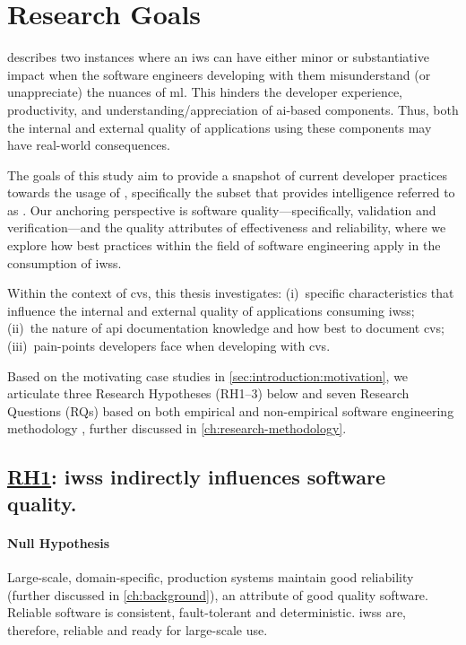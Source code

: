 \section{Research Goals}
\label{sec:introduction:hypohtesis}

 describes two instances where an \gls{iws} can have either minor or substantiative impact when the software engineers developing with them misunderstand (or unappreciate) the nuances of \gls{ml}. This hinders the developer experience, productivity, and understanding/appreciation of \gls{ai}-based components. Thus, both the internal and external quality of applications using these components may have real-world consequences.

The goals of this study aim to provide a snapshot of current developer practices towards the usage of , specifically the subset that provides  intelligence referred to as . Our anchoring perspective is software quality---specifically, validation and verification---and the quality attributes of effectiveness and reliability, where we explore  how best practices within the field of software engineering apply in the consumption of \glspl{iws}.

\begin{callout}
Within the context of \gls{cvs}, this thesis investigates: (i)~specific characteristics that influence the internal and external quality of applications consuming \glspl{iws}; (ii)~the nature of \gls{api} documentation knowledge and how best to document \gls{cvs}; (iii)~pain-points developers face when developing with \gls{cvs}.
\end{callout}

Based on the motivating case studies in \cref{sec:introduction:motivation}, we articulate three Research Hypotheses (RH1--3) below and seven Research Questions (RQs) based on  both empirical and non-empirical software engineering methodology \citep{Shull:2007vh,Simon:1996uw}, further discussed in \cref{ch:research-methodology}.


\newcommand{\rh}[1]{\hyperref[rh#1]{RH#1}}
\subsection[Research Hypothesis 1]{\underline{RH1}: \glspl{iws} indirectly influences software quality.}
\label{rh1}

\paragraph{Null Hypothesis}
Large-scale, domain-specific, production systems maintain good reliability (further discussed in \cref{ch:background}), an attribute of good quality software. Reliable software is consistent, fault-tolerant and deterministic. \Glspl{iws} are, therefore, reliable and ready for large-scale use.

